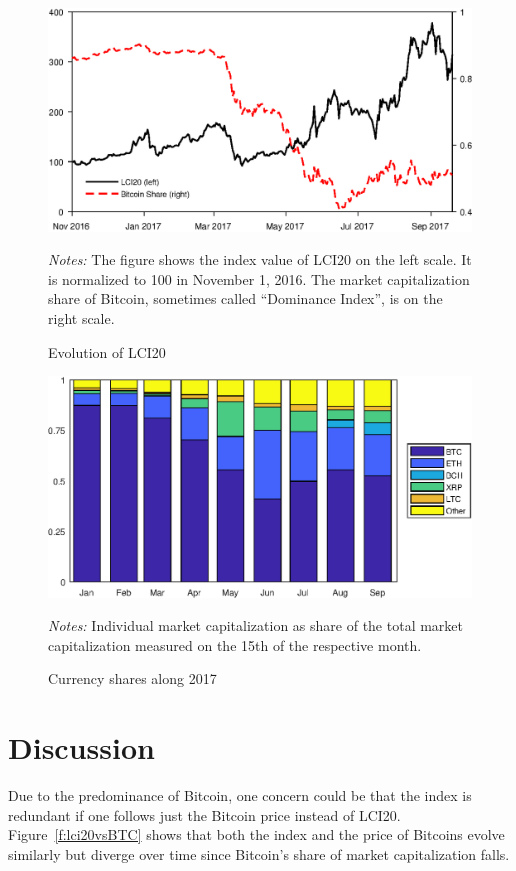 \documentclass[11pt]{article}
\newcommand\fnotes[1]{\captionsetup{font=scriptsize}\caption*{\textsl{Notes:} #1}}
\begin{document}
\begin{figure}[p]%
    \centering%
    \caption{Evolution of LCI20}\label{f:lci20}%
    \includegraphics[width=.8\textwidth]{figs/lci20.eps}%
    \smallskip\newline%
    \fnotes{The figure shows the index value of LCI20 on the left scale. It is normalized to 100 in November 1, 2016. The market capitalization share of Bitcoin, sometimes called ``Dominance Index'', is on the right scale.}
\end{figure}

\begin{figure}[p]%
    \centering%
    \caption{Currency shares along 2017}\label{f:curshares}%
    \includegraphics[width=.8\textwidth]{figs/currency_shares.eps}%
    \smallskip\newline%
    \fnotes{Individual market capitalization as share of the total market capitalization measured on the 15th of the respective month.}
\end{figure}


\section{Discussion}

 Due to the predominance of Bitcoin, one concern could be that the index is redundant if one follows just the Bitcoin price instead of LCI20.
 Figure~\ref{f:lci20vsBTC} shows that both the index and the price of Bitcoins evolve similarly but diverge over time since Bitcoin's share of market capitalization falls.
\end{document}
